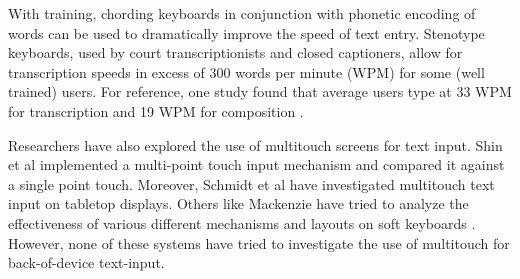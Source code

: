 With training, chording keyboards in conjunction with phonetic
encoding of words can be used to dramatically improve the speed of
text entry.  Stenotype keyboards, used by court transcriptionists and
closed captioners, allow for transcription speeds in excess of 300
words per minute (WPM) for some (well trained) users.  For reference,
one study found that average users type at 33 WPM for transcription
and 19 WPM for composition \cite{Karat}.

Researchers have also explored the use of multitouch screens for text
input. Shin et al \cite{Shin} implemented a multi-point touch input
mechanism and compared it against a single point touch. Moreover,
Schmidt et al \cite{Schmidt} have investigated multitouch text input
on tabletop displays. Others like Mackenzie have tried to analyze the
effectiveness of various different mechanisms and layouts on soft
keyboards \cite{Mac}. However, none of these systems have tried to
investigate the use of multitouch for back-of-device text-input.
